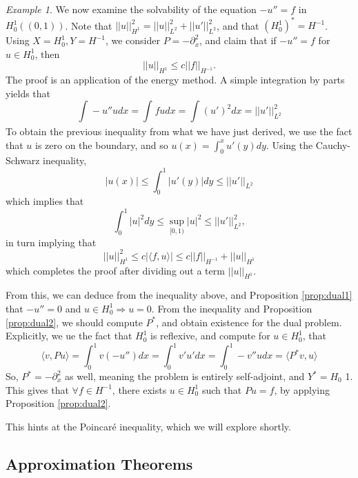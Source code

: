 \documentclass[letterpaper,10pt]{article}
\theoremstyle{definition}
\theoremstyle{remark}
\newtheorem*{eg}{Example}
\theoremstyle{plain}
\begin{document}
\begin{eg}
    We now examine the solvability of the equation $-u''=f$ in $H_0^1((0,1))$.
    Note that $||u||^2_{H^1}=||u||^2_{L^2}+||u'||^2_{L^2}$, and that 
    $(H_0^1)^*=H^{-1}$.
    Using $X=H_0^1, Y=H^{-1}$, we consider $P=-\partial_x^2$, and claim that 
    if $-u''=f$ for $u\in H_0^1$, then $$||u||_{H^1}\leq c||f||_{H^{-1}}.$$
    The proof is an application of the energy method.
    A simple integration by parts yields that 
    $$
    \int_{}^{}-u''udx=\int_{}^{}fudx=\int_{}^{}(u')^2dx=||u'||^2_{L^2}
    $$
    To obtain the previous inequality from what we have just derived, we use the fact that
    $u$ is zero on the boundary, and so $u(x)=\int_{0}^{x}u'(y)dy$.
    Using the Cauchy-Schwarz inequality,
    $$
    |u(x)|\leq\int_{0}^{1}|u'(y)|dy\leq ||u'||_{L^2}
    $$
    which implies that 
    $$
    \int_{0}^{1}|u|^2dy\leq\sup_{[0,1)}|u|^2\leq||u'||^2_{L^2},
    $$
    in turn implying that 
    $$
    ||u||^2_{H^1}\leq c|\langle f,u\rangle|\leq c||f||_{H^{-1}}+||u||_{H^1}
    $$
    which completes the proof after dividing out a term $||u||_{H^1}$.

    From this, we can deduce from the inequality above, and Proposition \ref{prop:dual1}
    that $-u''=0$ and $u\in H_0^1\Rightarrow u=0$.
    From the inequality and Proposition \ref{prop:dual2}, we should compute $P^*$,
    and obtain existence for the dual problem.
    Explicitly, we ue the fact that $H_0^1$ is reflexive, and compute
    for $u\in H_0^1$, that 
    $$
    \langle v, Pu\rangle=\int_{0}^{1}v(-u'')dx=\int_{0}^{1}v'u'dx=\int_{0}^{1}-v''udx
    =\langle P^*v,u\rangle
    $$
    So, $P^*=-\partial_x^2$ as well, meaning the problem is entirely self-adjoint, and 
    $Y^*=H_0$ 1. This gives that $\forall f\in H^{-1}$, there exists $u\in H_0^1$ such that 
    $Pu=f$, by applying Proposition \ref{prop:dual2}.
\end{eg}
This hints at the Poincar\'e inequality, which we will explore shortly.

\subsection{Approximation Theorems}
\end{document}

